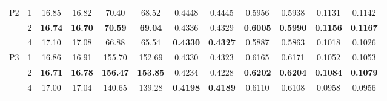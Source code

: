 \begin{table}[ht]
{\begin{tabular}{cccccccccccc}
\multicolumn{1}{c|}{\multirow{3}{*}{P2}} & \multicolumn{1}{c|}{1}    & \multicolumn{1}{c|}{16.85}          & \multicolumn{1}{c|}{16.82}          & \multicolumn{1}{c|}{70.40}           & \multicolumn{1}{c|}{68.52}           & \multicolumn{1}{c|}{0.4448}          & \multicolumn{1}{c|}{0.4445}          & \multicolumn{1}{c|}{0.5956}          & \multicolumn{1}{c|}{0.5938}          & \multicolumn{1}{c|}{0.1131}          & 0.1142          \\
\multicolumn{1}{c|}{}                    & \multicolumn{1}{c|}{2}    & \multicolumn{1}{c|}{\textbf{16.74}} & \multicolumn{1}{c|}{\textbf{16.70}} & \multicolumn{1}{c|}{\textbf{70.59}}  & \multicolumn{1}{c|}{\textbf{69.04}}  & \multicolumn{1}{c|}{0.4336}          & \multicolumn{1}{c|}{0.4329}          & \multicolumn{1}{c|}{\textbf{0.6005}} & \multicolumn{1}{c|}{\textbf{0.5990}} & \multicolumn{1}{c|}{\textbf{0.1156}} & \textbf{0.1167} \\
\multicolumn{1}{c|}{}                    & \multicolumn{1}{c|}{4}    & \multicolumn{1}{c|}{17.10}          & \multicolumn{1}{c|}{17.08}          & \multicolumn{1}{c|}{66.88}           & \multicolumn{1}{c|}{65.54}           & \multicolumn{1}{c|}{\textbf{0.4330}} & \multicolumn{1}{c|}{\textbf{0.4327}} & \multicolumn{1}{c|}{0.5887}          & \multicolumn{1}{c|}{0.5863}          & \multicolumn{1}{c|}{0.1018}          & 0.1026          \\ \hline
\multicolumn{1}{c|}{\multirow{3}{*}{P3}} & \multicolumn{1}{c|}{1}    & \multicolumn{1}{c|}{16.86}          & \multicolumn{1}{c|}{16.91}          & \multicolumn{1}{c|}{155.70}          & \multicolumn{1}{c|}{152.69}          & \multicolumn{1}{c|}{0.4330}          & \multicolumn{1}{c|}{0.4323}          & \multicolumn{1}{c|}{0.6165}          & \multicolumn{1}{c|}{0.6171}          & \multicolumn{1}{c|}{0.1052}          & 0.1053          \\
\multicolumn{1}{c|}{}                    & \multicolumn{1}{c|}{2}    & \multicolumn{1}{c|}{\textbf{16.71}} & \multicolumn{1}{c|}{\textbf{16.78}} & \multicolumn{1}{c|}{\textbf{156.47}} & \multicolumn{1}{c|}{\textbf{153.85}} & \multicolumn{1}{c|}{0.4234}          & \multicolumn{1}{c|}{0.4228}          & \multicolumn{1}{c|}{\textbf{0.6202}} & \multicolumn{1}{c|}{\textbf{0.6204}} & \multicolumn{1}{c|}{\textbf{0.1084}} & \textbf{0.1079} \\
\multicolumn{1}{c|}{}                    & \multicolumn{1}{c|}{4}    & \multicolumn{1}{c|}{17.00}          & \multicolumn{1}{c|}{17.04}          & \multicolumn{1}{c|}{140.65}          & \multicolumn{1}{c|}{139.28}          & \multicolumn{1}{c|}{\textbf{0.4198}} & \multicolumn{1}{c|}{\textbf{0.4189}} & \multicolumn{1}{c|}{0.6110}          & \multicolumn{1}{c|}{0.6108}          & \multicolumn{1}{c|}{0.0958}          & 0.0956          \\ \hline

\end{tabular}}
\end{table}
